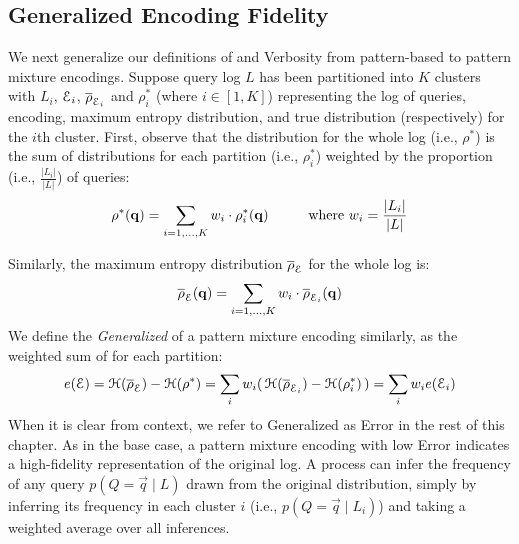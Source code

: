 \subsection{Generalized Encoding Fidelity}
\label{sec:generalizedinformationlossmeasures}
We next generalize our definitions of \errorname and Verbosity from pattern-based to pattern mixture encodings.
Suppose query log $L$ has been partitioned into $K$ clusters with $L_i$, $\mathcal E_i$, $\overline{\rho}_{\mathcal E_i}$ and $\rho^*_i$ (where $i \in [1,K]$) representing the log of queries, encoding, maximum entropy distribution, and true distribution (respectively) for the $i$th cluster. 
First, observe that the distribution for the whole log (i.e., $\rho^*$) is the sum of distributions for each partition (i.e., $\rho^*_i$) weighted by the proportion (i.e., $\frac{|L_i|}{|L|}$) of queries:
$$\rho^*(\vec{q})=\mysuml_{i=1,\ldots,K}w_i \cdot \rho^*_i(\vec{q}) \hspace{10mm}\text{where } w_i=\frac{|L_i|}{|L|}$$

Similarly, the maximum entropy distribution $\overline{\rho}_\mathcal E$ for the whole log is:
$$\overline{\rho}_\mathcal E(\mathbf{q})=\operatorname*{\sum}\limits_{i=1,\ldots,K}w_i\cdot\overline{\rho}_{\mathcal E_i}(\mathbf{q})$$
We define the \textit{Generalized \errorname} of a pattern mixture encoding similarly, as the weighted sum of \errorname for each partition:
{\small
$$e(\mathcal E)=\mathcal{H}(\overline{\rho}_\mathcal E)-\mathcal{H}(\rho^*)=\operatorname*{\sum}\limits_{i}w_i(\,\mathcal{H}(\overline{\rho}_{\mathcal E_i})-\mathcal{H}(\rho^*_i)\,)=\operatorname*{\sum}\limits_{i}w_i e(\mathcal E_i)$$
}
When it is clear from context, we refer to Generalized \errorname as Error in the rest of this chapter.
As in the base case, a pattern mixture encoding with low Error indicates a high-fidelity representation of the original log.
A process can infer the frequency of any query $p(Q=\vec q\;|\;L)$ drawn from the original distribution, simply by inferring its frequency in each cluster $i$ (i.e., $p(Q=\vec q\;|\;L_i)$) and taking a weighted average over all inferences. 

